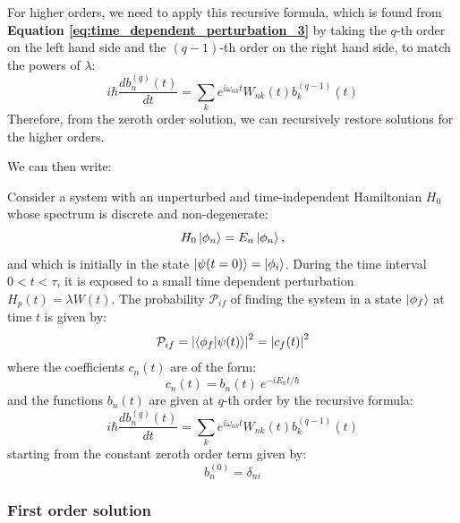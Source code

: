 For higher orders, we need to apply this recursive formula, which is found from \textbf{Equation \ref{eq:time_dependent_perturbation_3}} by taking the $q$-th order on the left hand side and the $(q-1)$-th order on the right hand side, to match the powers of $\lambda$:
\begin{equation}
    i\hbar \frac{d b_n^{(q)}(t)}{dt}  = \sum_k e^{i\omega_{nk}t}W_{nk}(t)  b_k^{(q-1)}(t)
\end{equation}
Therefore, from the zeroth order solution, we can recursively restore solutions for the higher orders. 

We can then write:
\begin{definition}
    Consider a system with an unperturbed and time-independent Hamiltonian $H_0$ whose spectrum is discrete and non-degenerate:
    \begin{equation}
        H_0 \ket{\phi_n} = E_n \ket{\phi_n},
    \end{equation}
    and which is initially in the state $\ket{\psi(t=0)} = \ket{\phi_i}$. During the time interval $0<t<\tau$, it is exposed to a small time dependent perturbation $H_p(t) = \lambda W(t)$. The probability $\mathcal{P}_{if}$ of finding the system in a state $\ket{\phi_f}$ at time $t$ is given by:
    \begin{equation}
        \mathcal{P}_{if} = \left|\braket{\phi_f|\psi(t)}\right|^2 = \left|c_f(t)\right|^2
    \end{equation}
    where the coefficients $c_n(t)$ are of the form:
    \begin{equation}
        c_n(t) = b_n(t)\ e^{-iE_nt/\hbar}
    \end{equation}
    and the functions $b_n(t)$ are given at $q$-th order by the recursive formula:
    \begin{equation} \label{recursive_bn}
        i\hbar \frac{d b_n^{(q)}(t)}{dt}  = \sum_k e^{i\omega_{nk}t}W_{nk}(t)  b_k^{(q-1)}(t)
    \end{equation}
    starting from the constant zeroth order term given by:
    \begin{equation}
        b_n^{(0)} = \delta_{ni}
    \end{equation}
\end{definition}

\subsubsection{First order solution}


